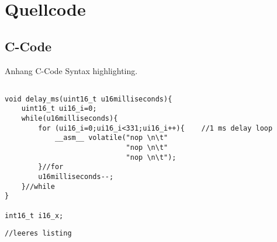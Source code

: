 \section{Quellcode}
\subsection{C-Code}
Anhang C-Code Syntax highlighting.

\begin{lstlisting}[frame=htrbl, caption={Das Listing zeigt C Quellcode}, label={lst:result2}]

void delay_ms(uint16_t u16milliseconds){
    uint16_t ui16_i=0;
    while(u16milliseconds){
        for (ui16_i=0;ui16_i<331;ui16_i++){    //1 ms delay loop
            __asm__ volatile("nop \n\t"
                             "nop \n\t"
                             "nop \n\t");
        }//for
        u16milliseconds--;
    }//while
}

int16_t i16_x;
\end{lstlisting}

\begin{lstlisting}[frame=htrbl, caption={leeres listing}, label={lst:leer}]
//leeres listing
\end{lstlisting}